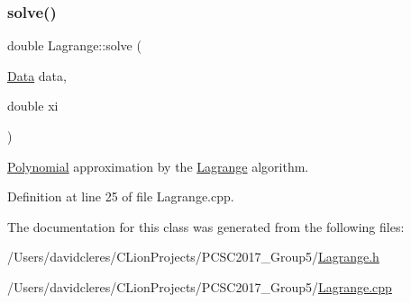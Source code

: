 \subsubsection{\texorpdfstring{solve()}{solve()}}
{\footnotesize\ttfamily double Lagrange\+::solve (\begin{DoxyParamCaption}\item[{\mbox{\hyperlink{struct_data}{Data}}}]{data,  }\item[{double}]{xi }\end{DoxyParamCaption})}



\mbox{\hyperlink{class_polynomial}{Polynomial}} approximation by the \mbox{\hyperlink{class_lagrange}{Lagrange}} algorithm. 



Definition at line 25 of file Lagrange.\+cpp.



The documentation for this class was generated from the following files\+:\begin{DoxyCompactItemize}
\item 
/\+Users/davidcleres/\+C\+Lion\+Projects/\+P\+C\+S\+C2017\+\_\+\+Group5/\mbox{\hyperlink{_lagrange_8h}{Lagrange.\+h}}\item 
/\+Users/davidcleres/\+C\+Lion\+Projects/\+P\+C\+S\+C2017\+\_\+\+Group5/\mbox{\hyperlink{_lagrange_8cpp}{Lagrange.\+cpp}}\end{DoxyCompactItemize}
